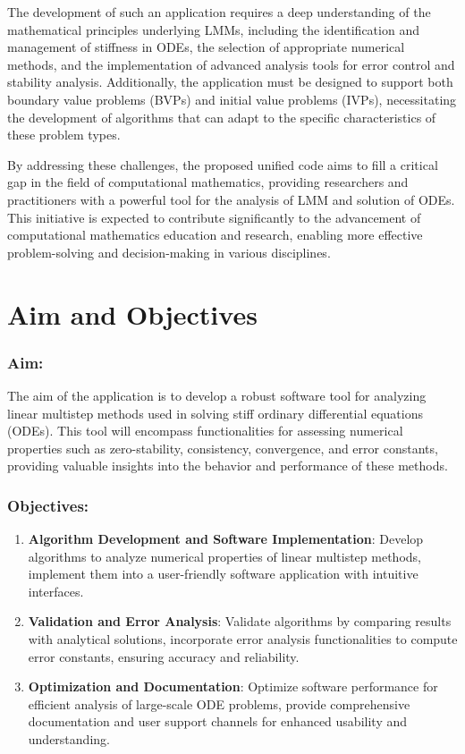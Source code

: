 The development of such an application requires a deep understanding of the mathematical principles underlying LMMs, including the identification and management of stiffness in ODEs, the selection of appropriate numerical methods, and the implementation of advanced analysis tools for error control and stability analysis. Additionally, the application must be designed to support both boundary value problems (BVPs) and initial value problems (IVPs), necessitating the development of algorithms that can adapt to the specific characteristics of these problem types.

By addressing these challenges, the proposed unified code aims to fill a critical gap in the field of computational mathematics, providing researchers and practitioners with a powerful tool for the analysis of LMM and solution of ODEs. This initiative is expected to contribute significantly to the advancement of computational mathematics education and research, enabling more effective problem-solving and decision-making in various disciplines.
\newpage
\section{Aim and Objectives}
\subsubsection{Aim:}
The aim of the application is to develop a robust software tool for analyzing linear multistep methods used in solving stiff ordinary differential equations (ODEs). This tool will encompass functionalities for assessing numerical properties such as zero-stability, consistency, convergence, and error constants, providing valuable insights into the behavior and performance of these methods.
\subsubsection{Objectives:}
\begin{enumerate}
  \item \textbf{Algorithm Development and Software Implementation}: Develop algorithms to analyze numerical properties of linear multistep methods, implement them into a user-friendly software application with intuitive interfaces.
    
  \item \textbf{Validation and Error Analysis}: Validate algorithms by comparing results with analytical solutions, incorporate error analysis functionalities to compute error constants, ensuring accuracy and reliability.
  
  \item \textbf{Optimization and Documentation}: Optimize software performance for efficient analysis of large-scale ODE problems, provide comprehensive documentation and user support channels for enhanced usability and understanding.

\end{enumerate}

